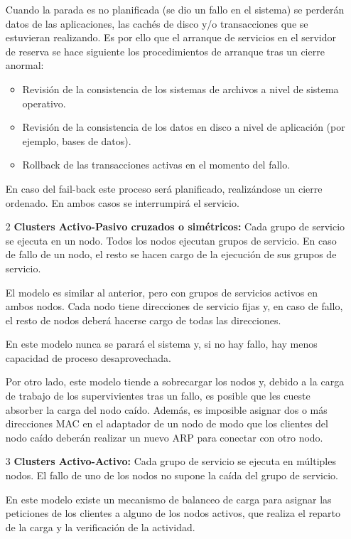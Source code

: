 \begin{enumerate}
Cuando la parada es no planificada (se dio un fallo en el sistema) se perderán datos de las aplicaciones, las cachés de disco y/o transacciones que se estuvieran realizando. Es por ello que el arranque de servicios en el servidor de reserva se hace siguiente los procedimientos de arranque tras un cierre anormal:
\begin{itemize}
\item Revisión de la consistencia de los sistemas de archivos a nivel de sistema operativo.
\item Revisión de la consistencia de los datos en disco a nivel de aplicación (por ejemplo, bases de datos).
\item Rollback de las transacciones activas en el momento del fallo.
\end{itemize}

En caso del fail-back este proceso será planificado, realizándose un cierre ordenado. En ambos casos se interrumpirá el servicio.

\item[2] \textbf{Clusters Activo-Pasivo cruzados o simétricos:} Cada grupo de servicio se ejecuta en un nodo. Todos los nodos ejecutan grupos de servicio. En caso de fallo de un nodo, el resto se hacen cargo de la ejecución de sus grupos de servicio.

El modelo es similar al anterior, pero con grupos de servicios activos en ambos nodos. Cada nodo tiene direcciones de servicio fijas y, en caso de fallo, el resto de nodos deberá hacerse cargo de todas las direcciones.

En este modelo nunca se parará el sistema y, si no hay fallo, hay menos capacidad de proceso desaprovechada.

Por otro lado, este modelo tiende a sobrecargar los nodos y, debido a la carga de trabajo de los supervivientes tras un fallo, es posible que les cueste absorber la carga del nodo caído. Además, es imposible asignar dos o más direcciones MAC en el adaptador de un nodo de modo que los clientes del nodo caído deberán realizar un nuevo ARP para conectar con otro nodo.


\item[3] \textbf{Clusters Activo-Activo:} Cada grupo de servicio se ejecuta en múltiples nodos. El fallo de uno de los nodos no supone la caída del grupo de servicio.

En este modelo existe un mecanismo de balanceo de carga para asignar las peticiones de los clientes a alguno de los nodos activos, que realiza el reparto de la carga y la verificación de la actividad.


\end{enumerate}
